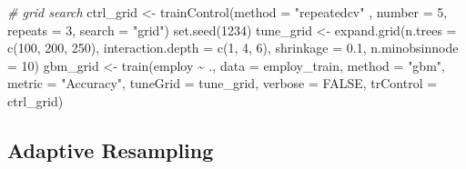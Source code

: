 \documentclass[
]{book}
\newenvironment{Shaded}{\begin{snugshade}}{\end{snugshade}}
\newcommand{\AttributeTok}[1]{\textcolor[rgb]{0.77,0.63,0.00}{#1}}
\newcommand{\CommentTok}[1]{\textcolor[rgb]{0.56,0.35,0.01}{\textit{#1}}}
\newcommand{\ConstantTok}[1]{\textcolor[rgb]{0.00,0.00,0.00}{#1}}
\newcommand{\DecValTok}[1]{\textcolor[rgb]{0.00,0.00,0.81}{#1}}
\newcommand{\FloatTok}[1]{\textcolor[rgb]{0.00,0.00,0.81}{#1}}
\newcommand{\FunctionTok}[1]{\textcolor[rgb]{0.00,0.00,0.00}{#1}}
\newcommand{\NormalTok}[1]{#1}
\newcommand{\OtherTok}[1]{\textcolor[rgb]{0.56,0.35,0.01}{#1}}
\newcommand{\SpecialCharTok}[1]{\textcolor[rgb]{0.00,0.00,0.00}{#1}}
\newcommand{\StringTok}[1]{\textcolor[rgb]{0.31,0.60,0.02}{#1}}
\begin{document}
\begin{Shaded}
\begin{Highlighting}[]
\CommentTok{\# grid search}
\NormalTok{ctrl\_grid }\OtherTok{\textless{}{-}} \FunctionTok{trainControl}\NormalTok{(}\AttributeTok{method =} \StringTok{"repeatedcv"}\NormalTok{ , }\AttributeTok{number =} \DecValTok{5}\NormalTok{, }
                          \AttributeTok{repeats =} \DecValTok{3}\NormalTok{, }
                          \AttributeTok{search =} \StringTok{"grid"}\NormalTok{)}
\FunctionTok{set.seed}\NormalTok{(}\DecValTok{1234}\NormalTok{)}
\NormalTok{tune\_grid }\OtherTok{\textless{}{-}} \FunctionTok{expand.grid}\NormalTok{(}\AttributeTok{n.trees =} \FunctionTok{c}\NormalTok{(}\DecValTok{100}\NormalTok{, }\DecValTok{200}\NormalTok{, }\DecValTok{250}\NormalTok{), }
                        \AttributeTok{interaction.depth =} \FunctionTok{c}\NormalTok{(}\DecValTok{1}\NormalTok{, }\DecValTok{4}\NormalTok{, }\DecValTok{6}\NormalTok{),}
                        \AttributeTok{shrinkage =} \FloatTok{0.1}\NormalTok{, }
                        \AttributeTok{n.minobsinnode =} \DecValTok{10}\NormalTok{)}
\NormalTok{gbm\_grid }\OtherTok{\textless{}{-}} \FunctionTok{train}\NormalTok{(employ }\SpecialCharTok{\textasciitilde{}}\NormalTok{ ., }\AttributeTok{data =}\NormalTok{ employ\_train, }\AttributeTok{method =} \StringTok{"gbm"}\NormalTok{, }
                  \AttributeTok{metric =} \StringTok{"Accuracy"}\NormalTok{, }\AttributeTok{tuneGrid =}\NormalTok{ tune\_grid, }
                  \AttributeTok{verbose =} \ConstantTok{FALSE}\NormalTok{,}
                  \AttributeTok{trControl =}\NormalTok{ ctrl\_grid)}
\end{Highlighting}
\end{Shaded}

\hypertarget{adaptive-resampling}{%
\subsection{Adaptive Resampling}\label{adaptive-resampling}}
\end{document}
